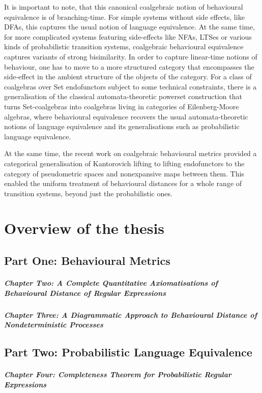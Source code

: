 It is important to note, that this canonical coalgebraic notion of behavioural equivalence is of branching-time. For simple systems without side effects, like DFAs, this captures the usual notion of language equivalence. At the same time, for more complicated systems featuring side-effects like NFAs, LTSes or various kinds of probabilistic transition systems, coalgebraic behavioural equivalence captures variants of strong bisimilarity. In order to capture linear-time notions of behaviour, one has to move to a more structured category that encompasses the side-effect in the ambient structure of the objects of the category. For a class of coalgebras over Set endofunctors subject to some technical constraints, there is a generalisation of the classical automata-theoretic powerset construction that turns Set-coalgebras into coalgebras living in categories of Eilenberg-Moore algebras, where behavioural equivalence recovers the usual automata-theoretic notions of language equivalence and its generalisations such as probabilistic language equivalence. 

At the same time, the recent work on coalgebraic behavioural metrics provided a categorical generalisation of Kantorovich lifting to lifting endofunctors to the category of pseudometric spaces and nonexpansive maps between them. This enabled the uniform treatment of behavioural distances for a whole range of transition systems, beyond just the probabilistic ones. 
\section{Overview of the thesis}
\subsection{Part One: Behavioural Metrics}
\subparagraph{Chapter Two: A Complete Quantitative Axiomatisations of Behavioural Distance of Regular Expressions}
\subparagraph{Chapter Three: A Diagrammatic Approach to Behavioural Distance of Nondeterministic Processes}
\subsection{Part Two: Probabilistic Language Equivalence}
\subparagraph{Chapter Four: Completeness Theorem for Probabilistic Regular Expressions}




